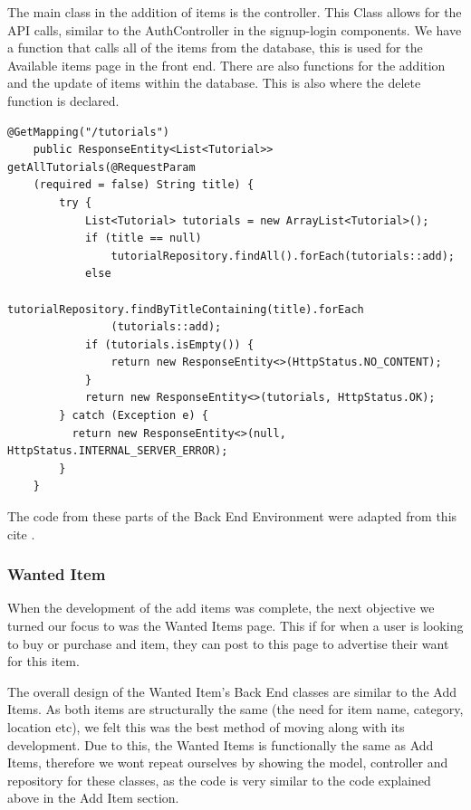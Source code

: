 The main class in the addition of items is the controller. This Class allows for the API calls, similar to the AuthController in the signup-login components. We have a function that calls all of the items from the database, this is used for the Available items page in the front end. There are also functions for the addition and the update of items within the database. This is also where the delete function is declared.
\begin{verbatim}
@GetMapping("/tutorials")
    public ResponseEntity<List<Tutorial>> getAllTutorials(@RequestParam
    (required = false) String title) {
        try {
            List<Tutorial> tutorials = new ArrayList<Tutorial>();
            if (title == null)
                tutorialRepository.findAll().forEach(tutorials::add);
            else
                tutorialRepository.findByTitleContaining(title).forEach
                (tutorials::add);
            if (tutorials.isEmpty()) {
                return new ResponseEntity<>(HttpStatus.NO_CONTENT);
            }
            return new ResponseEntity<>(tutorials, HttpStatus.OK);
        } catch (Exception e) {
          return new ResponseEntity<>(null, HttpStatus.INTERNAL_SERVER_ERROR);
        }
    }
\end{verbatim}
The code from these parts of the Back End Environment were adapted from this cite \cite{zKoder}.
\subsubsection{Wanted Item}
When the development of the add items was complete, the next objective we turned our focus to was the Wanted Items page. This if for when a user is looking to buy or purchase and item, they can post to this page to advertise their want for this item. \par
The overall design of the Wanted Item's Back End classes are similar to the Add Items. As both items are structurally the same (the need for item name, category, location etc), we felt this was the best method of moving along with its development. Due to this, the Wanted Items is functionally the same as Add Items, therefore we wont repeat ourselves by showing the model, controller and repository for these classes, as the code is very similar to the code explained above in the Add Item section. \par 

